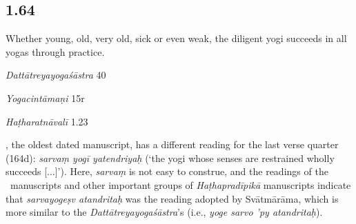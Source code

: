 \begin{ekdosis}
\subsection*{1.64}
\begin{translation}[hp01_064]
Whether young, old, very old, sick or even weak, the diligent yogi succeeds in all yogas through practice.
\end{translation}

\begin{sources}[hp01_064]
\emph{Dattātreyayogaśāstra} 40

\begin{versinnote}
\end{versinnote}

\end{sources}

\begin{testimonia}[hp01_064]
\emph{Yogacintāmaṇi} 15r

\begin{versinnote}
\end{versinnote}

\emph{Haṭharatnāvalī} 1.23

\begin{versinnote}
\end{versinnote}

\end{testimonia}

\begin{philcomm}[hp01_064]
\etaOne, the oldest dated manuscript, has a different reading for the last verse quarter (164d): \emph{sarvaṃ yogī yatendriyaḥ} (`the yogi whose senses are restrained wholly succeeds [...]'). Here, \emph{sarvaṃ} is not easy to construe, and the readings of the \textalpha\ manuscripts and other important groups of \emph{Haṭhapradīpikā} manuscripts indicate that \emph{sarvayogeṣv atandritaḥ} was the reading adopted by Svātmārāma, which is more similar to the \emph{Dattātreyayogaśāstra}'s (i.e., \emph{yoge sarvo 'py atandritaḥ}). 
\end{philcomm}


\end{ekdosis}
